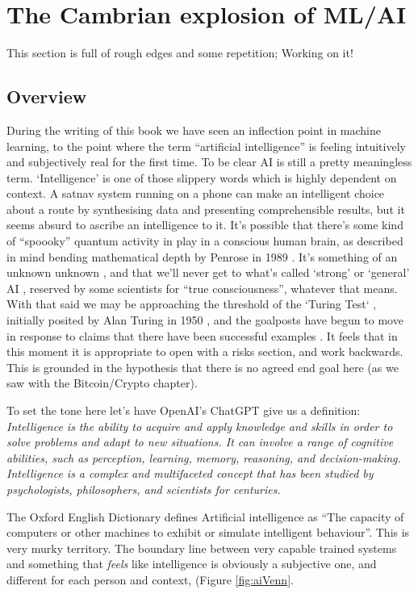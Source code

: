 \section{The Cambrian explosion of ML/AI}

This section is full of rough edges and some repetition; Working on it!

\subsection{Overview}
During the writing of this book we have seen an inflection point in machine learning, to the point where the term ``artificial intelligence'' is feeling intuitively and subjectively real for the first time.  To be clear AI is still a pretty meaningless term. `Intelligence' is one of those slippery words which is highly dependent on context. A satnav system running on a phone can make an intelligent choice about a route by synthesising data and presenting comprehensible results, but it seems absurd to ascribe an intelligence to it. It's possible that there's some kind of ``spoooky'' quantum activity in play in a conscious human brain, as described in mind bending mathematical depth by Penrose in 1989 \cite{penrose1990emperor}. It's something of an unknown unknown \cite{kerskens2022experimental}, and that we'll never get to what's called `strong' or `general' AI \cite{larson2021myth, searle1980minds}, reserved by some scientists for ``true consciousness'', whatever that means. With that said we may be approaching the threshold of the `Turing Test` \cite{sep-turing-test}, initially posited by Alan Turing in 1950 \cite{turing1950computing}, and the goalposts have begun to move in response to claims that there have been successful examples \cite{warwick2016can, french2012moving, french2000turing, searle2009turing}. It feels that in this moment it is appropriate to open with a risks section, and work backwards. This is grounded in the hypothesis that there is no agreed end goal here (as we saw with the Bitcoin/Crypto chapter).\par
To set the tone here let's have OpenAI's ChatGPT give us a definition:
\textit{Intelligence is the ability to acquire and apply knowledge and skills in order to solve problems and adapt to new situations. It can involve a range of cognitive abilities, such as perception, learning, memory, reasoning, and decision-making. Intelligence is a complex and multifaceted concept that has been studied by psychologists, philosophers, and scientists for centuries.}\par
The Oxford English Dictionary defines Artificial intelligence as ``The capacity of computers or other machines to exhibit or simulate intelligent behaviour''. This is very murky territory. The boundary line between very capable trained systems and something that \textit{feels} like intelligence is obviously a subjective one, and different for each person and context, (Figure \ref{fig:aiVenn}.\par

